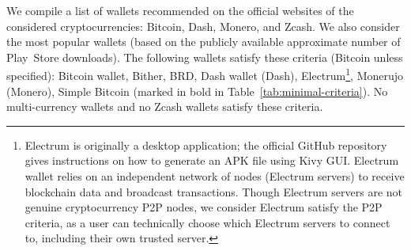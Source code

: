 We compile a list of wallets recommended on the official websites of the considered cryptocurrencies: Bitcoin, Dash, Monero, and Zcash.
We also consider the most popular wallets (based on the publicly available approximate number of Play~Store downloads).
The following wallets satisfy these criteria (Bitcoin unless specified): Bitcoin wallet, Bither, BRD, Dash wallet (Dash), Electrum\footnote{Electrum is originally a desktop application; the official GitHub repository gives instructions on how to generate an APK file using Kivy GUI\@. Electrum wallet relies on an independent network of nodes (Electrum servers) to receive blockchain data and broadcast transactions. Though Electrum servers are not genuine cryptocurrency P2P nodes, we consider Electrum satisfy the P2P criteria, as a user can technically choose which Electrum servers to connect to, including their own trusted server.}, Monerujo (Monero), Simple Bitcoin (marked in bold in Table~\ref{tab:minimal-criteria}).
No multi-currency wallets and no Zcash wallets satisfy these criteria.

